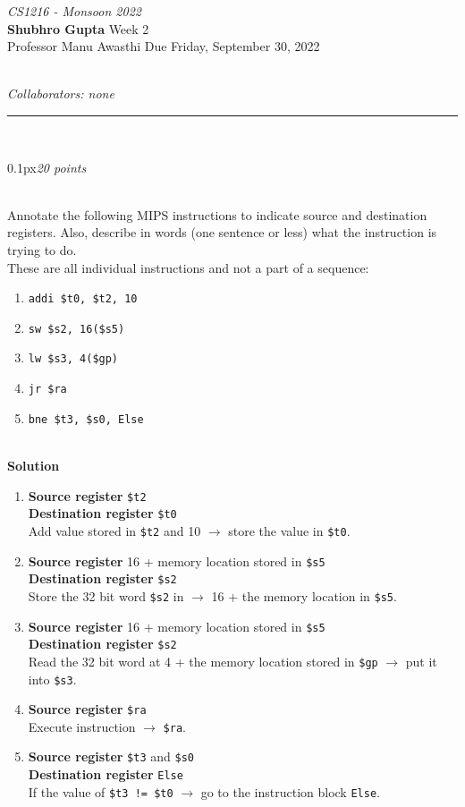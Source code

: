 \documentclass[11pt]{article}
\newcommand{\problem}[2]{\begin{adjustwidth}{0.1px}\noindent \framebox[1.2\width]{\large Problem #1}\hfill \emph{#2} \end{adjustwidth} \bigskip\\}
\newcommand{\code}[1]{{\texttt{#1}}}
\newcommand{\lesgo}[5]{
\begin{large}
\emph{#1}\smallskip \\
\textbf{Shubhro Gupta} \hfill Week #2\smallskip \\
Professor #3 \hfill Due #4\\
\end{large} \medskip \\
{\emph{Collaborators: #5}}\\
\hrule
\vspace{50px}
\\
}
\begin{document}
\lesgo{CS1216 - Monsoon 2022}{2}{Manu Awasthi}{Friday, September 30, 2022}{none}

\problem{1}{20 points}
Annotate the following MIPS instructions to indicate source and destination registers. Also, describe in words (one sentence or less) what the instruction is trying to do.  
\\ These are all individual instructions and not a part of a sequence:
\begin{enumerate}
    \item 
    \code{addi \$t0, \$t2, 10}
    \item 
    \code{sw \$s2, 16(\$s5)}
    \item
    \code{lw \$s3, 4(\$gp)}
    \item
    \code{jr \$ra}
    \item
    \code{bne \$t3, \$s0, Else}
\end{enumerate}
\bigskip \\
\textbf{Solution}
\begin{enumerate}
    \item 
    \textbf{Source register} \code{\$t2}\\
    \textbf{Destination register} \code{\$t0}
        \medskip\\
    Add value stored in \code{\$t2} and 10 $\rightarrow$ store the value in \code{\$t0}.
    
    \item 
    \textbf{Source register} 16 + memory location stored in \code{\$s5}\\
    \textbf{Destination register} \code{\$s2}
        \medskip\\
    Store the 32 bit word \code{\$s2} in $\rightarrow$ 16 + the memory location in \code{\$s5}.
    
    \item 
    \textbf{Source register} 16 + memory location stored in \code{\$s5}\\
    \textbf{Destination register} \code{\$s2}
        \medskip\\
    Read the 32 bit word at 4 + the memory location stored in \code{\$gp} $\rightarrow$ put it into \code{\$s3}.
    
    \item 
    \textbf{Source register} \code{\$ra}
        \medskip\\
    Execute instruction $\rightarrow$ \code{\$ra}.
    
    \item 
    \textbf{Source register} \code{\$t3} and \code{\$s0}\\
    \textbf{Destination register} \code{Else}
    \medskip\\
     If the value of \code{\$t3 != \$t0} $\rightarrow$
    go to the instruction block \code{Else}.
    
\end{enumerate}
\end{document}
